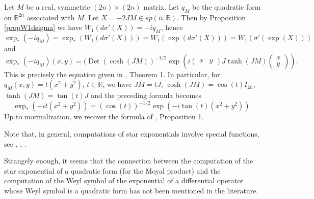 \documentclass[12pt]{amsart}
\numberwithin{equation}{section}
\DeclareMathOperator{\Det}{Det} \DeclareMathOperator{\Tr}{Tr}
\begin{document}
Let $M$ be a real, symmetric $(2n)\times (2n)$ matrix. Let $q_M$ be the quadratic form on
${\mathbb R}^{2n}$ associated with $M$. Let $X=-2JM\in sp(n,{\mathbb R})$. Then by Proposition \ref{propW1dsigma} we have $W_1(d\sigma'(X))=-iq_M$, hence
\begin{equation*}\exp_{\ast}(-iq_M)=\exp_{\ast}(W_1(d\sigma'(X)))=W_1(\exp(d\sigma'(X)))
=W_1(\sigma'(\exp(X)))\end{equation*}
and
\begin{equation*}\exp_{\ast}(-iq_M)(x,y)=
(\Det(\cosh (JM))^{-1/2}
\exp \left(i\begin{pmatrix}x&y\end{pmatrix}J\tanh (JM)
\begin{pmatrix}x\\y\end{pmatrix}\right).\end{equation*}
This is precisely the equation given in \cite{BM}, Theorem 1. In particular, for $q_M(x,y)=t(x^2+y^2)$, $t\in {\mathbb R}$, we have $JM=tJ$, $\cosh (JM)=\cos(t)I_{2n}$,
$\tanh(JM)=\tan (t)J$ and the preceding formula becomes
\begin{equation*}\exp_{\ast}(-it(x^2+y^2))=(\cos (t))^{-1/2}\exp( -i\tan (t)(x^2+y^2)).
\end{equation*}
Up to mormalization, we recover the formula of \cite{BFF}, Proposition 1.

Note that, in general, computations of star exponentials involve special functions, see
\cite{BFF}, \cite{GVS}, \cite{Fr}.

Strangely enough, it seems that the connection between the computation of the star exponential
of a quadratic form (for the Moyal product) and the computation of the Weyl symbol of the exponential of a differential operator whose Weyl symbol is a quadratic form
has not been mentioned in the literature.
\end{document}
